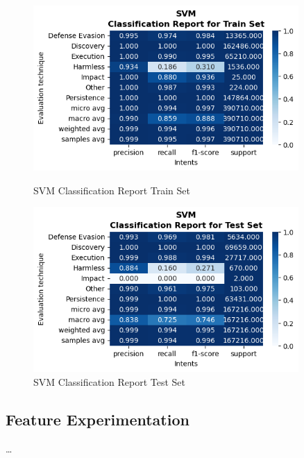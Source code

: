 \begin{figure}[H]
            \vspace{0.5cm}  %

            \begin{minipage}{\textwidth}
                \begin{minipage}[t]{0.48\textwidth}
                    \centering
                    \includegraphics[width=0.9\textwidth]{../figures/plots/section2/SVM_classification_report_for_Train_set.png}
                    \caption{SVM Classification Report Train Set}
                    \label{fig:}
                \end{minipage}%
                \hfill%
                \begin{minipage}[t]{0.48\textwidth}
                    \centering
                    \includegraphics[width=0.9\textwidth]{../figures/plots/section2/SVM_classification_report_for_Test_set.png}
                    \caption{SVM Classification Report Test Set}
                    \label{fig:}
                \end{minipage}  
            
            \end{minipage}
            
        \end{figure}
        
            
    \subsection{Feature Experimentation}
        
        \ldots %
        
